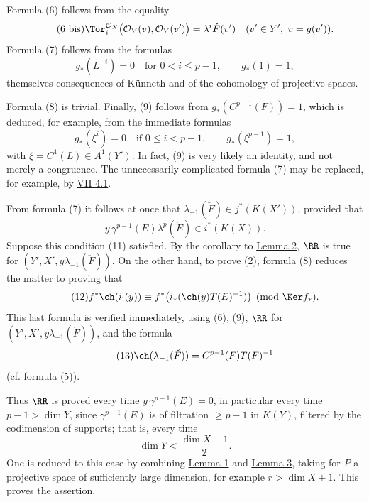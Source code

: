 Formula (6) follows from the equality
\begin{equation}\tag{6 bis}
  \Tor_i^{\mathcal O_X}\bigl(\mathcal O_Y(v),\mathcal O_Y(v')\bigr)
  =
  \lambda^i\check F(v')
  \quad (v'\in Y',\ v=g(v')).
\end{equation}
Formula (7) follows from the formulas
\begin{equation}\tag{10}
  g_*(L^{-i})=0\quad\text{for }0<i\leq p-1,\qquad g_*(1)=1,
\end{equation}
themselves consequences of Künneth and of the cohomology of projective spaces.

Formula (8) is trivial. Finally, (9) follows from \(g_*(C^{p-1}(F))=1\), which is deduced, for example, from the immediate formulas
\begin{equation}\tag{10 bis}
  g_*(\xi^i)=0\quad\text{if }0\leq i<p-1,\qquad
  g_*(\xi^{p-1})=1,
\end{equation}
with \(\xi=C^1(L)\in A^1(Y')\). In fact, (9) is very likely an identity, and not merely a congruence. The unnecessarily complicated formula (7) may be replaced, for example, by \hyperlink{sga6.e07.lem.4-1}{VII 4.1}.

From formula (7) it follows at once that \(\lambda_{-1}(\check F)\in j^*(K(X'))\), provided that
\begin{equation}\tag{11}
  y\,\gamma^{p-1}(E)\lambda^p(\check E)\in i^*(K(X)).
\end{equation}
Suppose this condition (11) satisfied. By the corollary to \hyperlink{sga6.e00.lem.2}{Lemma 2}, \(\RR\) is true for \((Y',X',y\lambda_{-1}(\check F))\). On the other hand, to prove (2), formula (8) reduces the matter to proving that
\begin{equation}\tag{12}
  f^*\ch(i_!(y))
  \equiv
  f^*\bigl(i_*(\ch(y)T(E)^{-1})\bigr)
  \pmod{\Ker f_*}.
\end{equation}
This last formula is verified immediately, using (6), (9), \(\RR\) for \((Y',X',y\lambda_{-1}(\check F))\), and the formula
\begin{equation}\tag{13}
  \ch(\lambda_{-1}(\check F))=C^{p-1}(F)T(F)^{-1}
\end{equation}
(cf. formula (5)).

Thus \(\RR\) is proved every time \(y\,\gamma^{p-1}(E)=0\), in particular every time \(p-1>\dim Y\), since \(\gamma^{p-1}(E)\) is of filtration \(\geq p-1\) in \(K(Y)\), filtered by the codimension of supports; that is, every time
\[
  \dim Y < \frac{\dim X-1}{2}.
\]
One is reduced to this case by combining \hyperlink{sga6.e00.lem.1}{Lemma 1} and \hyperlink{sga6.e00.lem.3}{Lemma 3}, taking for \(P\) a projective space of sufficiently large dimension, for example \(r>\dim X+1\). This proves the assertion.

